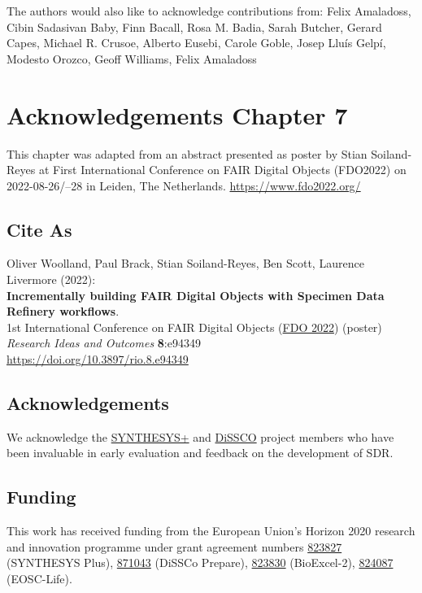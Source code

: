 The authors would also like to acknowledge contributions from: Felix
Amaladoss, Cibin Sadasivan Baby, Finn Bacall, Rosa M. Badia, Sarah
Butcher, Gerard Capes, Michael R. Crusoe, Alberto Eusebi, Carole Goble,
Josep Lluís Gelpí, Modesto Orozco, Geoff Williams, Felix Amaladoss



\section{Acknowledgements Chapter 7}

This chapter was adapted from an abstract
presented as poster by Stian Soiland-Reyes at 
First International Conference on FAIR Digital Objects 
(FDO2022) on
2022-08-26/--28 in Leiden, The Netherlands. 
\url{https://www.fdo2022.org/}

\subsection*{Cite As}

Oliver Woolland, Paul Brack, Stian Soiland-Reyes, Ben Scott, Laurence
Livermore (2022):\\
\textbf{Incrementally building FAIR Digital Objects with Specimen Data
Refinery workflows}.\\
1st International Conference on FAIR Digital Objects
(\href{https://www.fdo2022.org/}{FDO 2022}) (poster)\\
\emph{Research Ideas and Outcomes} \textbf{8}:e94349\\
\url{https://doi.org/10.3897/rio.8.e94349}


\subsection*{Acknowledgements}

We acknowledge the \href{https://www.synthesys.info/}{SYNTHESYS+} and
\href{https://www.dissco.eu/}{DiSSCO} project members who have been
invaluable in early evaluation and feedback on the development of SDR.

\hypertarget{funding-2}{%
\subsection*{Funding}\label{funding-2}}

This work has received funding from the European Union's Horizon 2020
research and innovation programme under grant agreement numbers
\href{https://doi.org/10.3030/https://doi.org/10.3030/}{823827}
(SYNTHESYS Plus), \href{https://doi.org/10.3030/871043}{871043} (DiSSCo
Prepare), \href{https://doi.org/10.3030/823830}{823830} (BioExcel-2),
\href{https://doi.org/10.3030/824087}{824087} (EOSC-Life).



